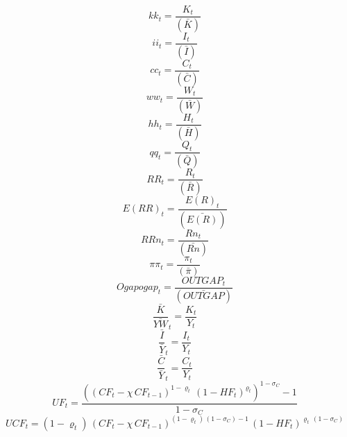 \begin{dmath}
{kk}_{t}=\frac{{K}_{t}}{(\bar{K})}
\end{dmath}
\begin{dmath}
{ii}_{t}=\frac{{I}_{t}}{(\bar{I})}
\end{dmath}
\begin{dmath}
{cc}_{t}=\frac{{C}_{t}}{(\bar{C})}
\end{dmath}
\begin{dmath}
{ww}_{t}=\frac{{W}_{t}}{(\bar{W})}
\end{dmath}
\begin{dmath}
{hh}_{t}=\frac{{H}_{t}}{(\bar{H})}
\end{dmath}
\begin{dmath}
{qq}_{t}=\frac{{Q}_{t}}{(\bar{Q})}
\end{dmath}
\begin{dmath}
{RR}_{t}=\frac{{R}_{t}}{(\bar{R})}
\end{dmath}
\begin{dmath}
{E(RR)}_{t}=\frac{{E(R)}_{t}}{(\bar{E(R)})}
\end{dmath}
\begin{dmath}
{RRn}_{t}=\frac{{Rn}_{t}}{(\bar{Rn})}
\end{dmath}
\begin{dmath}
{\pi\pi}_{t}=\frac{{\pi}_{t}}{(\bar{\pi})}
\end{dmath}
\begin{dmath}
{Ogapogap}_{t}=\frac{{OUTGAP}_{t}}{(\bar{OUTGAP})}
\end{dmath}
\begin{dmath}
{\frac{\bar{K}}{\bar{YW}}}_{t}=\frac{{K}_{t}}{{Y}_{t}}
\end{dmath}
\begin{dmath}
{\frac{\bar{I}}{\bar{Y}}}_{t}=\frac{{I}_{t}}{{Y}_{t}}
\end{dmath}
\begin{dmath}
{\frac{\bar{C}}{\bar{Y}}}_{t}=\frac{{C}_{t}}{{Y}_{t}}
\end{dmath}
\begin{dmath}
{UF}_{t}=\frac{\left(\left({CF}_{t}-{{\chi}}\, {CF}_{t-1}\right)^{1-{{\varrho}}_{t}}\, \left(1-{HF}_{t}\right)^{{{\varrho}}_{t}}\right)^{1-{{\sigma_{C}}}}-1}{1-{{\sigma_{C}}}}
\end{dmath}
\begin{dmath}
{UCF}_{t}=\left(1-{{\varrho}}_{t}\right)\, \left({CF}_{t}-{{\chi}}\, {CF}_{t-1}\right)^{\left(1-{{\varrho}}_{t}\right)\, \left(1-{{\sigma_{C}}}\right)-1}\, \left(1-{HF}_{t}\right)^{{{\varrho}}_{t}\, \left(1-{{\sigma_{C}}}\right)}
\end{dmath}
